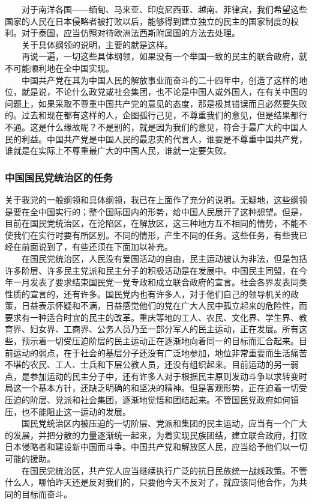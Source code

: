 \documentclass[cn,11pt,chinese]{elegantbook}
\def\myformat#1{\hfil\hfil #1}
\begin{document}
　　对于南洋各国——缅甸、马来亚、印度尼西亚、越南、菲律宾，我们希望这些国家的人民在日本侵略者被打败以后，能够得到建立独立的民主的国家制度的权利。对于泰国，应当仿照对待欧洲法西斯附属国的方法去处理。\\
　　关于具体纲领的说明，主要的就是这样。\\
　　再说一遍，一切这些具体纲领，如果没有一个举国一致的民主的联合政府，就不可能顺利地在全中国实现。\\
　　中国共产党在其为中国人民的解放事业而奋斗的二十四年中，创造了这样的地位，就是说，不论什么政党或社会集团，也不论是中国人或外国人，在有关中国的问题上，如果采取不尊重中国共产党的意见的态度，那是极其错误而且必然要失败的。过去和现在都有这样的人，企图孤行己见，不尊重我们的意见，但是结果都行不通。这是什么缘故呢？不是别的，就是因为我们的意见，符合于最广大的中国人民的利益。中国共产党是中国人民的最忠实的代言人，谁要是不尊重中国共产党，谁就是在实际上不尊重最广大的中国人民，谁就一定要失败。\\
\subsubsection*{\myformat{中国国民党统治区的任务}}
关于我党的一般纲领和具体纲领，我已在上面作了充分的说明。无疑地，这些纲领是要在全中国实行的；整个国际国内的形势，给中国人民展开了这种想望。但是，目前在国民党统治区，在沦陷区，在解放区，这三种地方互不相同的情势，不能不使我们在实行时要有所区别。不同的情形，产生不同的任务。这些任务，有些我已经在前面说到了，有些还须在下面加以补充。\\
　　在国民党统治区，人民没有爱国活动的自由，民主运动被认为非法，但是包括许多阶层、许多民主党派和民主分子的积极活动是在发展中。中国民主同盟，在今年一月发表了要求结束国民党一党专政和成立联合政府的宣言。社会各界发表同类性质的宣言的，还有许多。国民党内也有许多人，对于他们自己的领导机关的政策，日益表示怀疑和不满，日益感觉他们的党在广大人民中孤立起来的危险性，而要求有一种适合时宜的民主的改革。重庆等地的工人、农民、文化界、学生界、教育界、妇女界、工商界、公务人员乃至一部分军人的民主运动，正在发展。所有这些，预示着一切受压迫阶层的民主运动正在逐渐地向着同一的目标而汇合起来。目前运动的弱点，在于社会的基层分子还没有广泛地参加，地位非常重要而生活痛苦不堪的农民、工人、士兵和下层公教人员，还没有组织起来。目前运动的另一弱点，是参加运动的民主分子中，还有许多人对于根据民主原则发动斗争以求转变时局这一个基本方针，还缺乏明确的和坚决的精神。但是客观形势，正在迫着一切受压迫的阶层、党派和社会集团，逐渐地觉悟和团结起来。不管国民党政府如何镇压，也不能阻止这一运动的发展。\\
　　国民党统治区内被压迫的一切阶层、党派和集团的民主运动，应当有一个广大的发展，并把分散的力量逐渐统一起来，为着实现民族团结，建立联合政府，打败日本侵略者和建设新中国而斗争。中国共产党和解放区人民，应当给予他们以一切可能的援助。\\
　　在国民党统治区，共产党人应当继续执行广泛的抗日民族统一战线政策。不管什么人，哪怕昨天还是反对我们的，只要他今天不反对了，就应该同他合作，为共同的目标而奋斗。\\
\end{document}
